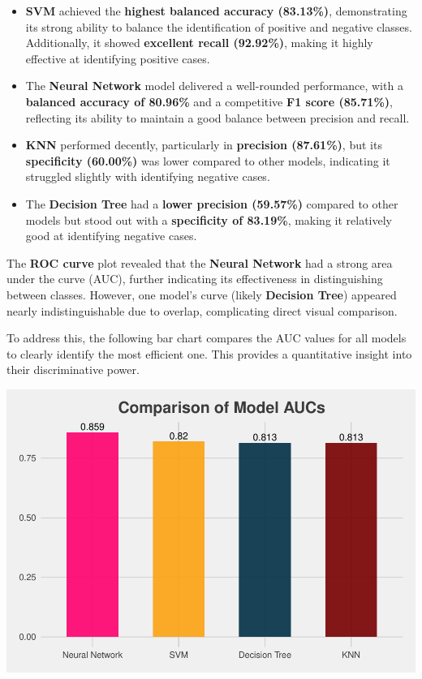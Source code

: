 \documentclass[
]{article}
\providecommand{\tightlist}{%
  \setlength{\itemsep}{0pt}\setlength{\parskip}{0pt}}
\begin{document}
\begin{itemize}
\tightlist
\item
  \textbf{SVM} achieved the \textbf{highest balanced accuracy
  (83.13\%)}, demonstrating its strong ability to balance the
  identification of positive and negative classes. Additionally, it
  showed \textbf{excellent recall (92.92\%)}, making it highly effective
  at identifying positive cases.
\item
  The \textbf{Neural Network} model delivered a well-rounded
  performance, with a \textbf{balanced accuracy of 80.96\%} and a
  competitive \textbf{F1 score (85.71\%)}, reflecting its ability to
  maintain a good balance between precision and recall.
\item
  \textbf{KNN} performed decently, particularly in \textbf{precision
  (87.61\%)}, but its \textbf{specificity (60.00\%)} was lower compared
  to other models, indicating it struggled slightly with identifying
  negative cases.
\item
  The \textbf{Decision Tree} had a \textbf{lower precision (59.57\%)}
  compared to other models but stood out with a \textbf{specificity of
  83.19\%}, making it relatively good at identifying negative cases.
\end{itemize}

The \textbf{ROC curve} plot revealed that the \textbf{Neural Network}
had a strong area under the curve (AUC), further indicating its
effectiveness in distinguishing between classes. However, one model's
curve (likely \textbf{Decision Tree}) appeared nearly indistinguishable
due to overlap, complicating direct visual comparison.

To address this, the following bar chart compares the AUC values for all
models to clearly identify the most efficient one. This provides a
quantitative insight into their discriminative power.

\begin{center}\includegraphics{Diabetes-Project_files/figure-latex/final comparision plot 2-1} \end{center}
\end{document}
